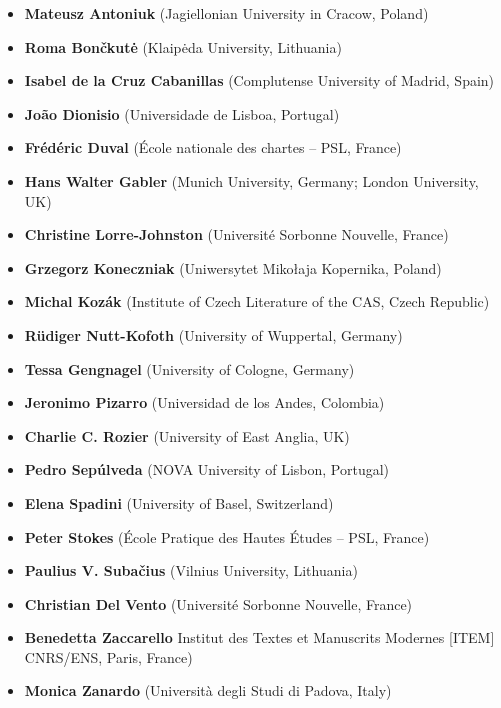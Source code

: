 \begin{itemize}
    \item \textbf{Mateusz Antoniuk} (Jagiellonian University in Cracow, Poland)
    \item \textbf{Roma Bončkutė} (Klaipėda University, Lithuania)
    \item \textbf{Isabel de la Cruz Cabanillas} (Complutense University of Madrid, Spain)
    \item \textbf{João Dionisio} (Universidade de Lisboa, Portugal)
    \item \textbf{Frédéric Duval} (École nationale des chartes -- PSL, France)
    \item \textbf{Hans Walter Gabler} (Munich University, Germany; London University, UK) 
    \item \textbf{Christine Lorre-Johnston} (Université Sorbonne Nouvelle, France)
    \item \textbf{Grzegorz Koneczniak} (Uniwersytet Mikołaja Kopernika, Poland)
    \item \textbf{Michal Kozák} (Institute of Czech Literature of the CAS, Czech Republic)
    \item \textbf{Rüdiger Nutt-Kofoth} (University of Wuppertal, Germany)
    \item \textbf{Tessa Gengnagel} (University of Cologne, Germany)
    \item \textbf{Jeronimo Pizarro} (Universidad de los Andes, Colombia)
    \item \textbf{Charlie C. Rozier} (University of East Anglia, UK)
    \item \textbf{Pedro Sepúlveda} (NOVA University of Lisbon, Portugal)
    \item \textbf{Elena Spadini} (University of Basel, Switzerland)
    \item \textbf{Peter Stokes} (École Pratique des Hautes Études -- PSL, France)
    \item \textbf{Paulius V. Subačius} (Vilnius University, Lithuania)
    \item \textbf{Christian Del Vento} (Université Sorbonne Nouvelle, France)
    \item \textbf{Benedetta Zaccarello} Institut des Textes et Manuscrits Modernes [ITEM] CNRS/ENS, Paris, France)
    \item \textbf{Monica Zanardo} (Università degli Studi di Padova, Italy)
\end{itemize}
